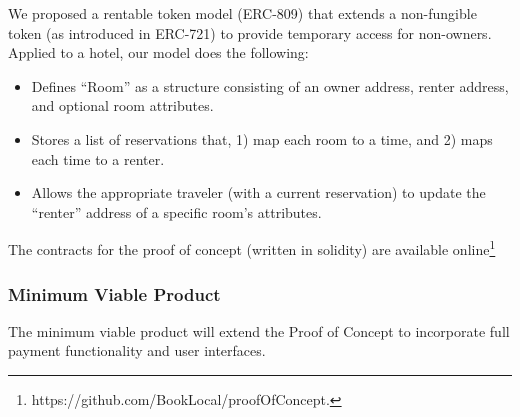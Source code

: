 \documentclass{article}
\begin{document}
\begin{flushleft}
We proposed a rentable token model (ERC-809) that extends a non-fungible token (as introduced in ERC-721) to provide temporary access for non-owners. Applied to a hotel, our model does the following: 

\begin{itemize}
\item Defines ``Room'' as a structure consisting of an owner address, renter address, and optional room attributes. 
\item Stores a list of reservations that, 1) map each room to a time, and 2) maps each time to a renter. 
\item Allows the appropriate traveler (with a current reservation) to update the ``renter'' address of a specific room's attributes. 
\end{itemize} 

The contracts for the proof of concept (written in solidity) are available online\footnote{https://github.com/BookLocal/proofOfConcept.}

\end{flushleft}

\subsubsection{Minimum Viable Product}
The minimum viable product will extend the Proof of Concept to incorporate full payment functionality and user interfaces. 
\end{document}

